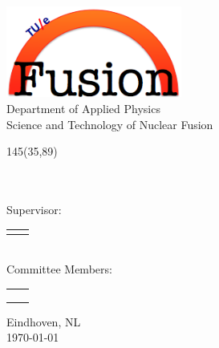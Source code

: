 \begin{titlepage}
\begin{center}
\includegraphics[height=3cm]{../Graphics/tue_fusion_logo}\\
\large
Department of Applied Physics  \\
Science and Technology of Nuclear Fusion

\vspace*{10cm}

\setlength{\TPHorizModule}{1mm}
\setlength{\TPVertModule}{\TPHorizModule}
\newlength{\backupparindent}
\setlength{\backupparindent}{\parindent}
\setlength{\parindent}{0mm}			
\begin{textblock}{145}(35,89)
	\vspace*{1mm}
	\huge
	\textbf{\doctitle \\}
	\Large
	\vspace*{8mm}
	\textit{\docsubtitle}\\
	\vspace*{15mm}
	\Large
	\me\\
\end{textblock}

\large
Supervisor:\\
\begin{tabular}{rl}
	\firstCommitteeMember\\
\end{tabular}
\\ \vspace*{5mm}
Committee Members:\\
\begin{tabular}{rl}
	\secondCommitteeMember\\
	\thirdCommitteeMember\\
	\fourthCommitteeMember\\
\end{tabular}


\vfill
\large
Eindhoven, NL\\
\today\\

\setlength{\parindent}{\backupparindent}
\end{center}
\end{titlepage}

